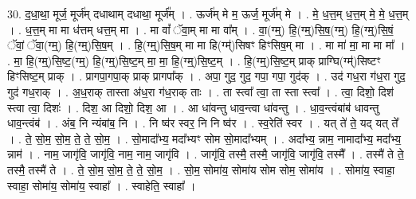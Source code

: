 \documentclass[17pt]{extarticle}
\begin{document}
30. द॒धा॒था॒ मूर्ज॒ मूर्ज॑म् दधाथाम् दधाथा॒ मूर्ज᳚म् । . ऊर्ज॑म् मे म॒ ऊर्ज॒ मूर्ज॑म् मे । . मे॒ ध॒त्त॒म् ध॒त्त॒म् मे॒ मे॒ ध॒त्त॒म् । . ध॒त्त॒म् मा मा ध॑त्तम् धत्त॒म् मा । . मा वां᳚ ॅवा॒म् मा मा वा᳚म् । . वा॒(ग्म्॒) हि॒(ग्म्॒)सि॒ष॒(ग्म्॒) हि॒(ग्म्॒)सि॒षं॒ ॅवां॒ ॅवा॒(ग्म्॒) हि॒(ग्म्॒)सि॒ष॒म् । . हि॒(ग्म्॒)सि॒ष॒म् मा मा हि(ग्म्॑)सिषꣳ हिꣳसिष॒म् मा । . मा मा॑ मा॒ मा मा मा᳚ । . मा॒ हि॒(ग्म्॒)सि॒ष्ट॒(ग्म्॒) हि॒(ग्म्॒)सि॒ष्ट॒म् मा॒ मा॒ हि॒(ग्म्॒)सि॒ष्ट॒म् । . हि॒(ग्म्॒)सि॒ष्ट॒म् प्राक् प्राग्घि(ग्म्॑)सिष्टꣳ हिꣳसिष्ट॒म् प्राक् । . प्रागपा॒गपा॒क् प्राक् प्रागपा᳚क् । . अपा॒ गुद॒ गुद॒ गपा॒ गपा॒ गुद॑क् । . उद॑ गध॒रा ग॑ध॒रा गुद॒ गुद॑ गध॒राक् । . अ॒ध॒राक् तास्ता अ॑ध॒रा ग॑ध॒राक् ताः । . ता स्त्वा᳚ त्वा॒ ता स्ता स्त्वा᳚ । . त्वा॒ दिशो॒ दिश॑ स्त्वा त्वा॒ दिशः॑ । . दिश॒ आ दिशो॒ दिश॒ आ । . आ धा॑वन्तु धाव॒न्त्वा धा॑वन्तु । . धा॒व॒न्त्वंबांब॑ धावन्तु धाव॒न्त्वंब॑ । . अंब॒ नि न्यंबांब॒ नि । . नि ष्व॑र स्वर॒ नि नि ष्व॑र । . स्व॒रेति॑ स्वर । . यत् ते॑ ते॒ यद् यत् ते᳚ । . ते॒ सो॒म॒ सो॒म॒ ते॒ ते॒ सो॒म॒ । . सो॒मादा᳚भ्य॒ मदा᳚भ्यꣳ सोम सो॒मादा᳚भ्यम् । . अदा᳚भ्य॒ न्नाम॒ नामादा᳚भ्य॒ मदा᳚भ्य॒ न्नाम॑ । . नाम॒ जागृ॑वि॒ जागृ॑वि॒ नाम॒ नाम॒ जागृ॑वि । . जागृ॑वि॒ तस्मै॒ तस्मै॒ जागृ॑वि॒ जागृ॑वि॒ तस्मै᳚ । . तस्मै॑ ते ते॒ तस्मै॒ तस्मै॑ ते । . ते॒ सो॒म॒ सो॒म॒ ते॒ ते॒ सो॒म॒ । . सो॒म॒ सोमा॑य॒ सोमा॑य सोम सोम॒ सोमा॑य । . सोमा॑य॒ स्वाहा॒ स्वाहा॒ सोमा॑य॒ सोमा॑य॒ स्वाहा᳚ । . स्वाहेति॒ स्वाहा᳚ । \newline
\end{document}
